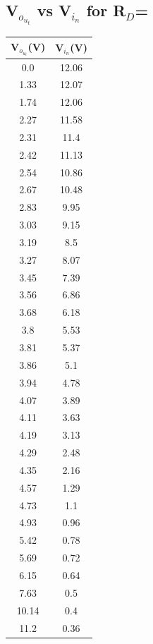 \documentclass[12pt]{article}
\begin{document}
\subsection{V$_o_u_t$ vs V$_i_n$ for R$_D$=}
\begin{center}
 \begin{tabular}{|| c | c||} 
 \hline
 V$_o_u_t$(V) &  V$_i_n$(V)\\ [0.5ex] 
 \hline\hline
 0.0 & 12.06 \\
\hline
1.33 & 12.07 \\
\hline
1.74 & 12.06 \\
\hline
2.27 & 11.58 \\
\hline
2.31 & 11.4 \\
\hline
2.42 & 11.13 \\
\hline
2.54 & 10.86 \\
\hline
2.67 & 10.48 \\
\hline
2.83 & 9.95 \\
\hline
3.03 & 9.15 \\
\hline
3.19 & 8.5 \\
\hline
3.27 & 8.07 \\
\hline
3.45 & 7.39 \\
\hline
3.56 & 6.86 \\
\hline
3.68 & 6.18 \\
\hline
3.8 & 5.53 \\
\hline
3.81 & 5.37 \\
\hline
3.86 & 5.1 \\
\hline
3.94 & 4.78 \\
\hline
4.07 & 3.89 \\
\hline
4.11 & 3.63 \\
\hline
4.19 & 3.13 \\
\hline
4.29 & 2.48 \\
\hline
4.35 & 2.16 \\
\hline
4.57 & 1.29 \\
\hline
4.73 & 1.1 \\
\hline
4.93 & 0.96 \\
\hline
5.42 & 0.78 \\
\hline
5.69 & 0.72 \\
\hline
6.15 & 0.64 \\
\hline
7.63 & 0.5 \\
\hline
10.14 & 0.4 \\
\hline
11.2 & 0.36 \\
\hline

\end{tabular}
\end{center}
\end{document}
